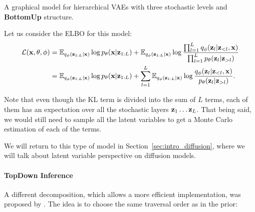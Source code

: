 \begin{marginfigure}
\caption{A graphical model for hierarchical VAEs with three stochastic levels and  \textbf{BottomUp} structure.}\label{subfig:introbottom_up_vae}
\end{marginfigure}
Let us consider the ELBO for this model:
\begin{align}
    \mathcal{L}(\rvx, \theta, \phi) &= \E_{q_{\phi}(\rvz_{1:L}|\rvx)}\log p_{\theta}(\rvx|\rvz_{1:L}) + \E_{q_{\phi}(\rvz_{1:L}|\rvx)} \log \frac{\prod_{l=1}^L q_{\phi}(\rvz_l|\rvz_{<l}, \rvx)}{\prod_{l=1}^L p_{\theta}(\rvz_l|\rvz_{>l})} \label{eq:intro_bottom_up_elbo_1}\\
    &=\E_{q_{\phi}(\rvz_{1:L}|\rvx)}\log p_{\theta}(\rvx|\rvz_{1:L}) +  \sum_{l=1}^L \E_{q_{\phi}(\rvz_{1:L}|\rvx)}\log \frac{ q_{\phi}(\rvz_l|\rvz_{<l}, \rvx)}{p_{\theta}(\rvz_l|\rvz_{>l})}.\label{eq:intro_bottom_up_elbo_2}
\end{align}

Note that even though the KL term is divided into the sum of $L$ terms, each of them has an expectation over all the stochastic layers ${\mathbf{z}}_1\dots{\mathbf{z}}_L$. That being said, we would still need to sample all the latent variables to get a Monte Carlo estimation of each of the terms. 

We will return to this type of model in Section~\ref{sec:intro_diffusion}, where we will talk about latent variable perspective on diffusion models. 


\paragraph{TopDown Inference}
A different decomposition, which allows a more efficient implementation, was proposed by \citet{sonderby2016ladder}.  The idea is to choose the same traversal order as in the prior:

